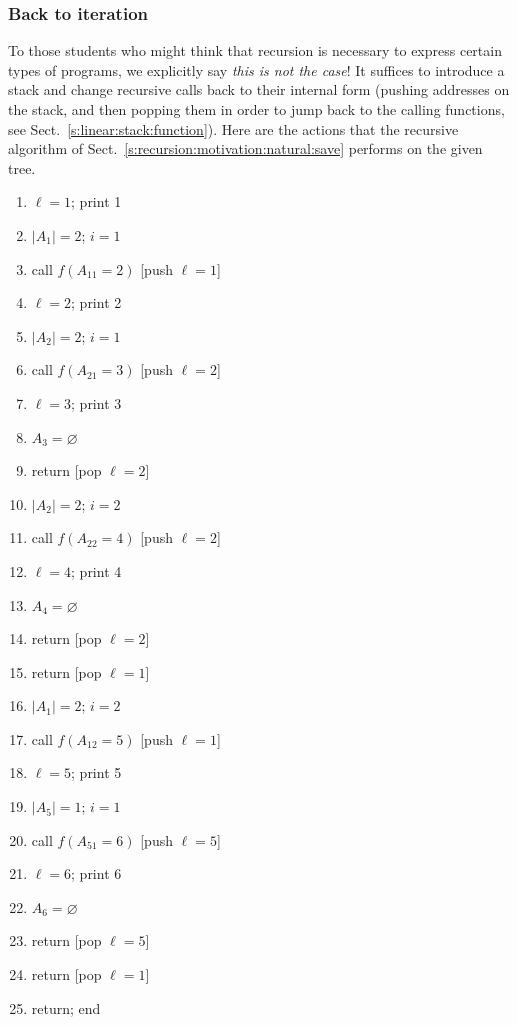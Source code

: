 \documentclass[a4paper]{book}
\theoremstyle{changebreak}                %
\begin{document}
\subsubsection{Back to iteration}
To those students who might think that recursion is necessary to
express certain types of programs, we explicitly say {\it this is not
  the case}! It suffices to introduce a stack and change
recursive calls back to their internal form (pushing
addresses on the stack, and then
popping them in order to jump back to the calling
functions, see Sect.~\ref{s:linear:stack:function}). Here are the
actions that the recursive algorithm of
Sect.~\ref{s:recursion:motivation:natural:save} performs on the given
tree.
\begin{enumerate}
\setlength{\parskip}{-0.5em}
\item $\ell=1$; print 1
\item $|A_1|=2$; $i=1$
\item call $f(A_{11}=2)$ [push $\ell=1$]
\item $\ell=2$; print 2
\item $|A_2|=2$; $i=1$ 
\item call $f(A_{21}=3)$ [push $\ell=2$]
\item $\ell=3$; print 3
\item $A_3=\varnothing$
\item return \hspace*{1.15cm} [pop $\ell=2$]
\item $|A_2|=2$; $i=2$
\item call $f(A_{22}=4)$ [push $\ell=2$]
\item $\ell=4$; print 4
\item $A_4=\varnothing$
\item return \hspace*{1.15cm} [pop $\ell=2$]
\item return \hspace*{1.15cm} [pop $\ell=1$]
\item $|A_1|=2$; $i=2$
\item call $f(A_{12}=5)$ [push $\ell=1$]
\item $\ell=5$; print 5
\item $|A_5|=1$; $i=1$
\item call $f(A_{51}=6)$ [push $\ell=5$]
\item $\ell=6$; print 6
\item $A_6=\varnothing$
\item return \hspace*{1.15cm} [pop $\ell=5$]
\item return \hspace*{1.15cm} [pop $\ell=1$]
\item return; end
\end{enumerate}
\end{document}
